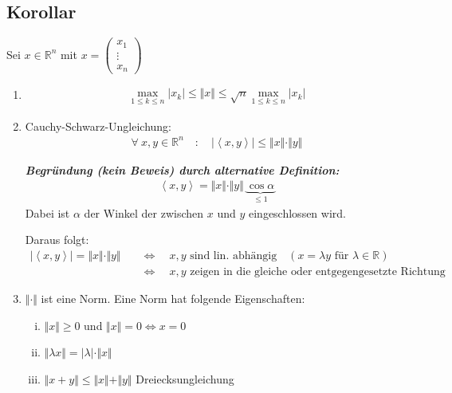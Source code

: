 \documentclass[11pt,a4paper]{book}
\newcommand {\R}	{\mathbb{R}}
\newcommand {\Rn}	{\mathbb{R}^n}
\newcommand{\1}    	{\mathbbm{1}}
\newcommand{\Beweis}[1][Beweis]
{\begin{mdframed}[backgroundcolor=gray!10,linewidth=0pt]\noindent\textit{\textbf{{#1}:}}~}
\newcommand{\QED}	{\end{mdframed}}
\begin{document}
\subsection{Korollar}
Sei \(x \in \Rn\) mit \(x = \left(\begin{array}{c} x_1 \\ \vdots \\ x_n \end{array}\right)\)
\begin{enumerate}[1.~]
	\item \begin{align*}
		\max_{1 \leqslant k \leqslant n} \vert x_k \vert \leqslant \Vert x \Vert \leqslant \sqrt{n} \max_{1 \leqslant k \leqslant n} \vert x_k \vert
	\end{align*}
	\item Cauchy-Schwarz-Ungleichung:
	\begin{align*}
		\forall~ x,y \in \Rn \quad : \quad \vert \left< x,y \right> \vert \leqslant \Vert x \Vert \cdot \Vert y \Vert
	\end{align*}
	\Beweis[Begründung (kein Beweis) durch alternative Definition]
	\begin{align*}
		\left< x,y \right> = \Vert x \Vert \cdot \Vert y \Vert ~ \underbrace{\cos \alpha}_{\leqslant 1}
	\end{align*}
	Dabei ist \(\alpha\) der Winkel der zwischen \(x\) und \(y\) eingeschlossen wird.
	\QED
	Daraus folgt:
	\begin{align*}
		\vert \left< x,y \right> \vert = \Vert x \Vert \cdot \Vert y \Vert
		\quad&\Leftrightarrow\quad
		x,y \textrm{ sind lin. abhängig} \quad (x = \lambda y \textrm{ für } \lambda \in \R) \\
		&\Leftrightarrow\quad x, y \textrm{ zeigen in die gleiche oder entgegengesetzte Richtung}
	\end{align*}
	\item \(\Vert \cdot \Vert\) ist eine Norm. Eine Norm hat folgende Eigenschaften:
	\begin{enumerate}[(i)]
		\item \( \Vert x \Vert \geqslant 0 \) und \( \Vert x \Vert = 0 \Leftrightarrow x = 0 \)
		\item \( \Vert \lambda x \Vert = \vert \lambda \vert \cdot \Vert x \Vert  \)
		\item \( \Vert x + y \Vert \leqslant \Vert x \Vert  + \Vert y \Vert \) Dreiecksungleichung
	\end{enumerate}
\end{enumerate}
\end{document}
